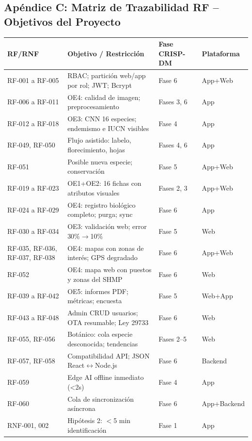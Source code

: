 \documentclass[12pt, a4paper]{article}
\begin{document}
\subsection{Ap\'endice C: Matriz de Trazabilidad RF -- Objetivos del Proyecto}

\begin{longtable}{|p{3cm}|p{5.2cm}|p{2.8cm}|p{2.5cm}|}
\hline
\textbf{RF/RNF} & \textbf{Objetivo / Restricci\'on} & \textbf{Fase CRISP-DM} & \textbf{Plataforma} \\
\hline
\endhead
RF-001 a RF-005 & RBAC; partici\'on web/app por rol; JWT; Bcrypt & Fase 6 & App+Web \\
\hline
RF-006 a RF-011 & OE4: calidad de imagen; preprocesamiento & Fases 3, 6 & App \\
\hline
RF-012 a RF-018 & OE3: CNN 16 especies; endemismo e IUCN visibles & Fase 4 & App \\
\hline
RF-049, RF-050 & Flujo asistido: labelo, florecimiento, hojas & Fases 4, 6 & App \\
\hline
RF-051 & Posible nueva especie; conservaci\'on & Fase 5 & App+Web \\
\hline
RF-019 a RF-023 & OE1+OE2: 16 fichas con atributos visuales & Fases 2, 3 & App+Web \\
\hline
RF-024 a RF-029 & OE4: registro biol\'ogico completo; purga; sync & Fase 6 & App \\
\hline
RF-030 a RF-034 & OE3: validaci\'on web; error 30\%$\to$10\% & Fase 5 & Web \\
\hline
RF-035, RF-036, RF-037, RF-038 & OE4: mapas con zonas de inter\'es; GPS degradado & Fase 6 & App+Web \\
\hline
RF-052 & OE4: mapa web con puestos y zonas del SHMP & Fase 6 & Web \\
\hline
RF-039 a RF-042 & OE5: informes PDF; m\'etricas; encuesta & Fase 5 & Web+App \\
\hline
RF-043 a RF-048 & Admin CRUD usuarios; OTA resumable; Ley 29733 & Fase 6 & Web \\
\hline
RF-055, RF-056 & Bot\'anico: cola especie desconocida; tendencias & Fases 2--5 & Web \\
\hline
RF-057, RF-058 & Compatibilidad API; JSON React$\leftrightarrow$Node.js & Fase 6 & Backend \\
\hline
RF-059 & Edge AI offline inmediato (<2s) & Fase 4 & App \\
\hline
RF-060 & Cola de sincronización asíncrona & Fase 6 & App+Backend \\
\hline
RNF-001, 002 & Hip\'otesis 2: $<$5 min identificaci\'on & Fase 1 & App \\

\end{longtable}
\end{document}
